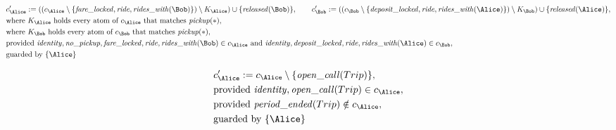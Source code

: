 \begin{align*}
&
c'_
{
\Alice
}
 := 
(
(c_
{
\Alice
}
 \setminus 
\{
\mathit{\detokenize{
fare_locked
}}
,
\mathit{\detokenize{
ride
}}
,
\mathit{\detokenize{
rides_with
}}
(
\Bob
)
\}
) \setminus K_
{
\Alice
}
) \cup 
\{
\mathit{\detokenize{
released
}}
(
\Bob
)
\}
, \qquad 
c'_
{
\Bob
}
 := 
(
(c_
{
\Bob
}
 \setminus 
\{
\mathit{\detokenize{
deposit_locked
}}
,
\mathit{\detokenize{
ride
}}
,
\mathit{\detokenize{
rides_with
}}
(
\Alice
)
\}
) \setminus K_
{
\Bob
}
) \cup 
\{
\mathit{\detokenize{
released
}}
(
\Alice
)
\}
,\\
&
\text{where } K_
{
\Alice
}
 \text{ holds every atom of } c_
{
\Alice
}
 \text{ that matches } 
\mathit{\detokenize{
pickup
}}
(
\ast
)
,\\
&
\text{where } K_
{
\Bob
}
 \text{ holds every atom of } c_
{
\Bob
}
 \text{ that matches } 
\mathit{\detokenize{
pickup
}}
(
\ast
)
,\\
&
\text{provided } 
\mathit{\detokenize{
identity
}}
,
\mathit{\detokenize{
no_pickup
}}
,
\mathit{\detokenize{
fare_locked
}}
,
\mathit{\detokenize{
ride
}}
,
\mathit{\detokenize{
rides_with
}}
(
\Bob
)
 \in c_
{
\Alice
}
 \text{ and } 
\mathit{\detokenize{
identity
}}
,
\mathit{\detokenize{
deposit_locked
}}
,
\mathit{\detokenize{
ride
}}
,
\mathit{\detokenize{
rides_with
}}
(
\Alice
)
 \in c_
{
\Bob
}
,\\
&
\text{guarded by } \{
\Alice
\}
\end{align*}

\begin{align*}
&
c'_
{
\Alice
}
 := 
c_
{
\Alice
}
 \setminus 
\{
\mathit{\detokenize{
open_call
}}
(
Trip
)
\}
,\\
&
\text{provided } 
\mathit{\detokenize{
identity
}}
,
\mathit{\detokenize{
open_call
}}
(
Trip
)
 \in c_
{
\Alice
}
,\\
&
\text{provided } 
\mathit{\detokenize{
period_ended
}}
(
Trip
)
 \notin c_
{
\Alice
}
,\\
&
\text{guarded by } \{
\Alice
\}
\end{align*}
